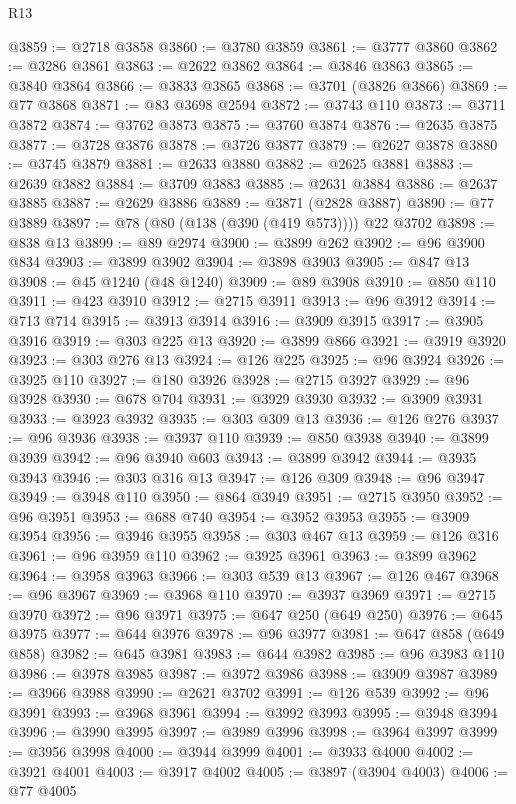 \begin{lexlean}{R13}
\begin{coremodule}
{{{{{{{{{{{{{{{{{{{{{{{{{{{{{{{{{{{{{{{{{{{{{{{{{{{{{{{{{{{{{{{{{{{{{{{{{{{{{{{{{{{{{{{{{{{{{{{{{{{{{{{{{{@3859 := @2718 @3858
@3860 := @3780 @3859
@3861 := @3777 @3860
@3862 := @3286 @3861
@3863 := @2622 @3862
@3864 := @3846 @3863
@3865 := @3840 @3864
@3866 := @3833 @3865
@3868 := @3701 (@3826 @3866)
@3869 := @77 @3868
@3871 := @83 @3698 @2594
@3872 := @3743 @110
@3873 := @3711 @3872
@3874 := @3762 @3873
@3875 := @3760 @3874
@3876 := @2635 @3875
@3877 := @3728 @3876
@3878 := @3726 @3877
@3879 := @2627 @3878
@3880 := @3745 @3879
@3881 := @2633 @3880
@3882 := @2625 @3881
@3883 := @2639 @3882
@3884 := @3709 @3883
@3885 := @2631 @3884
@3886 := @2637 @3885
@3887 := @2629 @3886
@3889 := @3871 (@2828 @3887)
@3890 := @77 @3889
@3897 := @78 (@80 (@138 (@390 (@419 @573)))) @22 @3702
@3898 := @838 @13
@3899 := @89 @2974
@3900 := @3899 @262
@3902 := @96 @3900 @834
@3903 := @3899 @3902
@3904 := @3898 @3903
@3905 := @847 @13
@3908 := @45 @1240 (@48 @1240)
@3909 := @89 @3908
@3910 := @850 @110
@3911 := @423 @3910
@3912 := @2715 @3911
@3913 := @96 @3912
@3914 := @713 @714
@3915 := @3913 @3914
@3916 := @3909 @3915
@3917 := @3905 @3916
@3919 := @303 @225 @13
@3920 := @3899 @866
@3921 := @3919 @3920
@3923 := @303 @276 @13
@3924 := @126 @225
@3925 := @96 @3924
@3926 := @3925 @110
@3927 := @180 @3926
@3928 := @2715 @3927
@3929 := @96 @3928
@3930 := @678 @704
@3931 := @3929 @3930
@3932 := @3909 @3931
@3933 := @3923 @3932
@3935 := @303 @309 @13
@3936 := @126 @276
@3937 := @96 @3936
@3938 := @3937 @110
@3939 := @850 @3938
@3940 := @3899 @3939
@3942 := @96 @3940 @603
@3943 := @3899 @3942
@3944 := @3935 @3943
@3946 := @303 @316 @13
@3947 := @126 @309
@3948 := @96 @3947
@3949 := @3948 @110
@3950 := @864 @3949
@3951 := @2715 @3950
@3952 := @96 @3951
@3953 := @688 @740
@3954 := @3952 @3953
@3955 := @3909 @3954
@3956 := @3946 @3955
@3958 := @303 @467 @13
@3959 := @126 @316
@3961 := @96 @3959 @110
@3962 := @3925 @3961
@3963 := @3899 @3962
@3964 := @3958 @3963
@3966 := @303 @539 @13
@3967 := @126 @467
@3968 := @96 @3967
@3969 := @3968 @110
@3970 := @3937 @3969
@3971 := @2715 @3970
@3972 := @96 @3971
@3975 := @647 @250 (@649 @250)
@3976 := @645 @3975
@3977 := @644 @3976
@3978 := @96 @3977
@3981 := @647 @858 (@649 @858)
@3982 := @645 @3981
@3983 := @644 @3982
@3985 := @96 @3983 @110
@3986 := @3978 @3985
@3987 := @3972 @3986
@3988 := @3909 @3987
@3989 := @3966 @3988
@3990 := @2621 @3702
@3991 := @126 @539
@3992 := @96 @3991
@3993 := @3968 @3961
@3994 := @3992 @3993
@3995 := @3948 @3994
@3996 := @3990 @3995
@3997 := @3989 @3996
@3998 := @3964 @3997
@3999 := @3956 @3998
@4000 := @3944 @3999
@4001 := @3933 @4000
@4002 := @3921 @4001
@4003 := @3917 @4002
@4005 := @3897 (@3904 @4003)
@4006 := @77 @4005
}}}}}}}}}}}}}}}}}}}}}}}}}}}}}}}}}}}}}}}}}}}}}}}}}}}}}}}}}}}}}}}}}}}}}}}}}}}}}}}}}}}}}}}}}}}}}}}}}}}}}}}}}}
\end{coremodule}
\end{lexlean}
